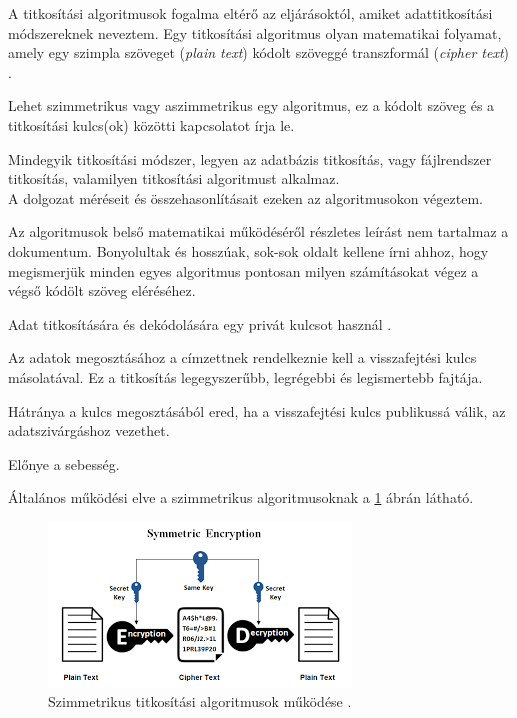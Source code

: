 
A titkosítási algoritmusok fogalma eltérő az eljárásoktól, amiket adattitkosítási módszereknek neveztem. Egy titkosítási algoritmus olyan matematikai folyamat, amely egy szimpla szöveget (\textit{plain text}) kódolt szöveggé transzformál (\textit{cipher text}) \cite{thakkar2022blog}.

Lehet szimmetrikus vagy aszimmetrikus egy algoritmus, ez a kódolt szöveg és a titkosítási kulcs(ok) közötti kapcsolatot írja le.

Mindegyik titkosítási módszer, legyen az adatbázis titkosítás, vagy fájlrendszer titkosítás, valamilyen titkosítási algoritmust alkalmaz.
\\A dolgozat méréseit és összehasonlításait ezeken az algoritmusokon végeztem.

Az algoritmusok belső matematikai működéséről részletes leírást nem tartalmaz a dokumentum. Bonyolultak és hosszúak, sok-sok oldalt kellene írni ahhoz, hogy megismerjük minden egyes algoritmus pontosan milyen számításokat végez a végső kódölt szöveg eléréséhez.
 
\noindent Adat titkosítására és dekódolására egy privát kulcsot használ \cite{abd2010evaluating}.

Az adatok megosztásához a címzettnek rendelkeznie kell a visszafejtési kulcs másolatával. Ez a titkosítás legegyszerűbb, legrégebbi és legismertebb fajtája.

Hátránya a kulcs megosztásából ered, ha a visszafejtési kulcs publikussá válik, az adatszivárgáshoz vezethet.

Előnye a sebesség. \newline

Általános működési elve a szimmetrikus algoritmusoknak a \ref{fig:sym_encryption} ábrán látható.
\begin{figure}[H]
	\centering
	\includegraphics[scale=0.75]{images/sym.png}
	\caption{Szimmetrikus titkosítási algoritmusok működése \cite{ssl2buywiki}.}
	\label{fig:sym_encryption}
\end{figure}

